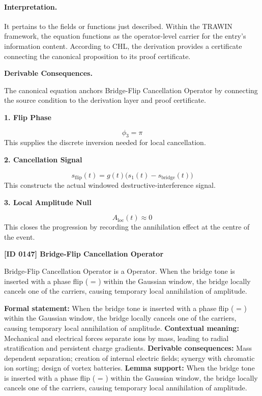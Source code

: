\paragraph{Interpretation.}
It pertains to the fields or functions just described. Within the TRAWIN framework, the equation functions as the operator-level carrier for the entry’s information content. According to CHL, the derivation provides a certificate connecting the canonical proposition to its proof certificate.

\par\vspace{0.35em}
\noindent\textbf{Derivable Consequences.}\quad
\begingroup
\footnotesize
\raggedright
The canonical equation anchors Bridge-Flip Cancellation Operator by connecting the source condition to the derivation layer and proof certificate.
\par\endgroup

\noindent\textbf{1. Flip Phase}\par
\[
\phi_3=\pi
\]
\noindent This supplies the discrete inversion needed for local cancellation.\par
\noindent\textbf{2. Cancellation Signal}\par
\[
s_{\mathrm{flip}}(t)=g(t)\bigl(s_1(t)-s_{\mathrm{bridge}}(t)\bigr)
\]
\noindent This constructs the actual windowed destructive-interference signal.\par
\noindent\textbf{3. Local Amplitude Null}\par
\[
A_{\mathrm{loc}}(t)\approx 0
\]
\noindent This closes the progression by recording the annihilation effect at the centre of the event.\par

\clearpage
\noindent\textbf{[ID 0147] Bridge-Flip Cancellation Operator}\par
\vspace{0.35em}
\begingroup\small
{}
Bridge-Flip Cancellation Operator is a Operator. When the bridge tone is inserted with a phase flip (   =  ) within the Gaussian window, the bridge locally cancels one of the carriers, causing temporary local annihilation of amplitude.

\begingroup\footnotesize\setlength{\emergencystretch}{3em}\sloppy
\textbf{Formal statement:} When the bridge tone is inserted with a phase flip (   =  ) within the Gaussian window, the bridge locally cancels one of the carriers, causing temporary local annihilation of amplitude.
\textbf{Contextual meaning:} Mechanical and electrical forces separate ions by mass, leading to radial stratification and persistent charge gradients.
\textbf{Derivable consequences:} Mass dependent separation; creation of internal electric fields; synergy with chromatic ion sorting; design of vortex batteries.
\textbf{Lemma support:} When the bridge tone is inserted with a phase flip (   =  ) within the Gaussian window, the bridge locally cancels one of the carriers, causing temporary local annihilation of amplitude.\par
\endgroup

